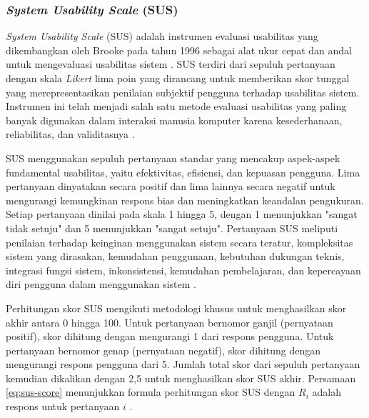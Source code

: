 
\subsubsection{\emph{System Usability Scale} (SUS)}
\label{subsubsec:sus}

\emph{System Usability Scale} (SUS) adalah instrumen evaluasi usabilitas yang dikembangkan oleh Brooke pada tahun 1996 sebagai alat ukur cepat dan andal untuk mengevaluasi usabilitas sistem \parencite{brooke1996sus}. SUS terdiri dari sepuluh pertanyaan dengan skala \emph{Likert} lima poin yang dirancang untuk memberikan skor tunggal yang merepresentasikan penilaian subjektif pengguna terhadap usabilitas sistem. Instrumen ini telah menjadi salah satu metode evaluasi usabilitas yang paling banyak digunakan dalam interaksi manusia komputer karena kesederhanaan, reliabilitas, dan validitasnya \parencite{bangor2008empirical}.

SUS menggunakan sepuluh pertanyaan standar yang mencakup aspek-aspek fundamental usabilitas, yaitu efektivitas, efisiensi, dan kepuasan pengguna. Lima pertanyaan dinyatakan secara positif dan lima lainnya secara negatif untuk mengurangi kemungkinan respons bias dan meningkatkan keandalan pengukuran. Setiap pertanyaan dinilai pada skala 1 hingga 5, dengan 1 menunjukkan "sangat tidak setuju" dan 5 menunjukkan "sangat setuju". Pertanyaan SUS meliputi penilaian terhadap keinginan menggunakan sistem secara teratur, kompleksitas sistem yang dirasakan, kemudahan penggunaan, kebutuhan dukungan teknis, integrasi fungsi sistem, inkonsistensi, kemudahan pembelajaran, dan kepercayaan diri pengguna dalam menggunakan sistem \parencite{brooke1996sus}.

Perhitungan skor SUS mengikuti metodologi khusus untuk menghasilkan skor akhir antara 0 hingga 100. Untuk pertanyaan bernomor ganjil (pernyataan positif), skor dihitung dengan mengurangi 1 dari respons pengguna. Untuk pertanyaan bernomor genap (pernyataan negatif), skor dihitung dengan mengurangi respons pengguna dari 5. Jumlah total skor dari sepuluh pertanyaan kemudian dikalikan dengan 2,5 untuk menghasilkan skor SUS akhir. Persamaan \eqref{eq:sus-score} menunjukkan formula perhitungan skor SUS dengan $R_i$ adalah respons untuk pertanyaan $i$ \parencite{tullis2013measuring}.

